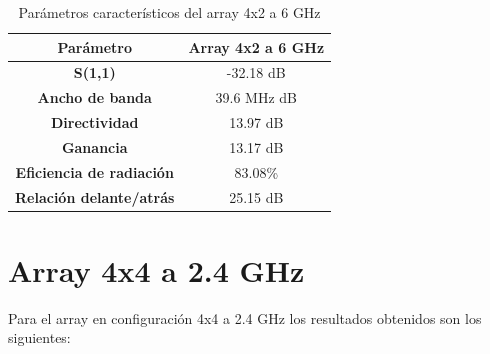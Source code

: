 \begin{table}[H]
  
   
   \small %
   \centering %
   \begin{tabular}{c c} %
   \toprule[\heavyrulewidth]\toprule[\heavyrulewidth]
   \textbf{Parámetro} & \textbf{Array 4x2 a 6 GHz} \\ 
   \midrule
   \textbf{S(1,1)} & -32.18 dB \\
   \textbf{Ancho de banda} & 39.6 MHz dB \\
   \textbf{Directividad} & 13.97 dB \\
   \textbf{Ganancia} & 13.17 dB \\
   \textbf{Eficiencia de radiación} & 83.08\% \\
   \textbf{Relación delante/atrás} & 25.15 dB \\

   \bottomrule[\heavyrulewidth] 
   \end{tabular}
   
   \caption{Parámetros característicos del array 4x2 a 6 GHz} 
   \label{tab:res4x22}
\end{table}






















\newpage
\section{Array 4x4 a 2.4 GHz}
\par Para el array en configuración 4x4 a 2.4 GHz los resultados obtenidos son los siguientes:

